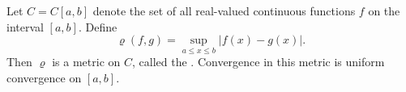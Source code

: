 Let $C = C[a, b]$ denote the set of all real-valued continuous functions $f$ on the interval $[a, b]$. Define
$$
\varrho(f, g) = \sup_{a \leq x \leq b} |f(x) - g(x)|.
$$
Then $\varrho$ is a metric on $C$, called the . Convergence in this metric is uniform convergence on $[a, b]$.
